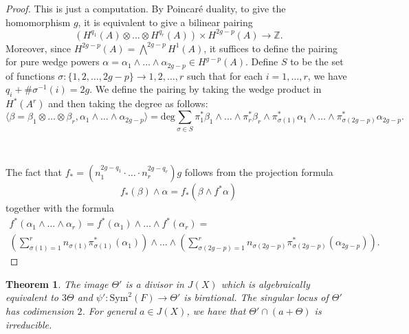 \documentclass[amssymb,twoside,12 pt,amscd,reqno]{amsart}
\theoremstyle{plain}
\newtheorem{thm}{Theorem}[section]
\theoremstyle{definition}
\newcommand{\ZZ}{\mathbb{Z}}
\def\ps{\vspace{4pt}}
\newcommand{\lt}{\left}
\newcommand{\rt}{\right}
\begin{document}
\begin{proof}  This is just a computation.  By Poincar\'e duality, to
give the homomorphism $g$, it is equivalent to give a bilinear pairing
\begin{equation}
\lt(H^{q_1}(A)\otimes \dots \otimes H^{q_r}(A)\rt) \times H^{2g-p}(A)
\rightarrow \ZZ. 
\end{equation}
Moreover, since $H^{2g-p}(A)= \bigwedge^{2g-p}H^1(A)$, it suffices to
define the pairing for pure wedge powers
$\alpha = \alpha_1\wedge\dots\wedge\alpha_{2g-p}\in H^{g-p}(A)$.  
Define $S$ to be the set of functions
$\sigma:\{1,2,\dots,2g-p\}\rightarrow {1,2,\dots, r}$ such that for each 
$i=1,\dots, r$, we have $q_i+\#\sigma^{-1}(i) = 2g$.  
We define the pairing by taking the wedge product in $H^*(A^r)$ and
then taking the degree as follows:
\begin{equation}
\langle \beta = \beta_1\otimes \dots \otimes \beta_r, \alpha_1\wedge\dots
\wedge \alpha_{2g-p}\rangle = \text{deg}\sum_{\sigma\in S}
\pi_1^*\beta_1 \wedge \dots \wedge \pi_r^*\beta_r \wedge
\pi_{\sigma(1)}^*\alpha_1 \wedge \dots \wedge
\pi_{\sigma(2g-p)}^*\alpha_{2g-p}.
\end{equation}

\

The fact that $f_* = \lt(n_1^{2g-q_1}\cdot \dots \cdot
n_r^{2g-q_r}\rt) g$ follows from the projection formula
\begin{equation}
f_*(\beta)\wedge \alpha = f_*(\beta\wedge f^*\alpha)
\end{equation}
together with the formula
\begin{eqnarray}
f^*(\alpha_1\wedge\dots\wedge\alpha_r) = f^*(\alpha_1)\wedge \dots
\wedge f^*(\alpha_r) =  \\
\lt( \sum_{\sigma(1)=1}^r
n_{\sigma(1)}\pi_{\sigma(1)}^*(\alpha_1)\rt) \wedge \dots \wedge \lt(
\sum_{\sigma(2g-p)=1}^r
n_{\sigma(2g-p)}\pi_{\sigma(2g-p)}^*(\alpha_{2g-p})\rt). \nonumber
\end{eqnarray}

\end{proof}

\ps

\begin{thm}\label{sec-thmu}
The image $\Theta'$ is a divisor in $J(X)$ which is algebraically 
equivalent to $3\Theta$ and $\psi':\text{Sym}^2(F)\rightarrow \Theta'$
is birational.  The singular locus of $\Theta'$ has codimension
$2$.  For general $a\in J(X)$, we have that $\Theta'\cap(a+\Theta)$
is irreducible.
\end{thm}
\end{document}
